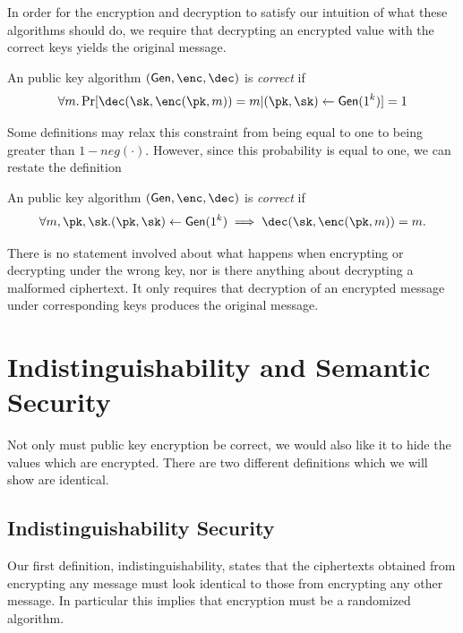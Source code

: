 \documentclass[12pt]{tufte-book}
\newcommand{\gen}{\mathsf{Gen}}
\begin{document}
In order for the encryption and decryption to satisfy our intuition of what these
algorithms should do, we require that decrypting an encrypted value with the
correct keys yields the original message.

\begin{definition}[Correctness]
An public key algorithm $(\gen, \enc, \dec)$ is \emph{correct} if
\begin{equation*}
\forall m . \Pr[\dec(\sk, \enc(\pk, m))=m | (\pk,\sk) \gets \gen(1^k)] = 1
\end{equation*}
\end{definition}

Some definitions may relax this constraint from being equal to one to being greater
than $1-neg(\cdot)$. However, since this probability is equal to one, we can restate
the definition

\begin{lemma}[Correctness]
An public key algorithm $(\gen, \enc, \dec)$ is \emph{correct} if
\begin{equation*}
\forall m, \pk,\sk . (\pk,\sk) \gets \gen(1^k) \implies \dec(\sk, \enc(\pk, m))=m.
\end{equation*}
\end{lemma}

There is no statement involved about what happens when encrypting or decrypting
under the wrong key, nor is there anything about decrypting a malformed ciphertext.
It only requires that decryption of an encrypted message under corresponding
keys produces the original message.

\section{Indistinguishability and Semantic Security}

Not only must public key encryption be correct, we would also like it to hide
the values which are encrypted. There are two different definitions which we
will show are identical.

\subsection{Indistinguishability Security}
Our first definition, indistinguishability, states that the ciphertexts
obtained from encrypting any message must look identical to those from encrypting
any other message. In particular this implies that encryption must be a randomized
algorithm.
\end{document}
